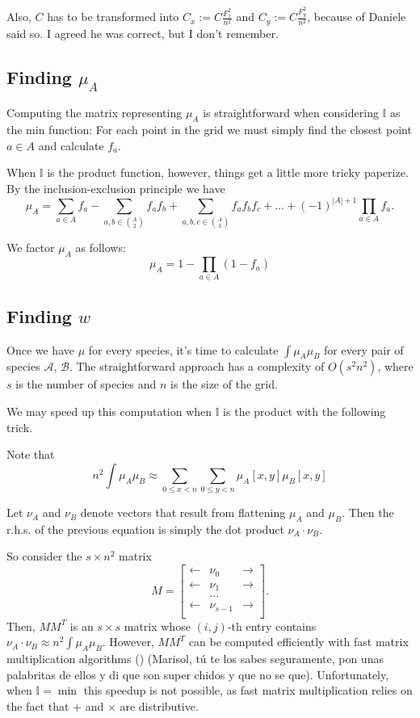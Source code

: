 \documentclass[12pt]{article}
\numberwithin{equation}{section} %
\numberwithin{figure}{section} %
\def\cA{{\mathcal{A}}}
\def\cB{{\mathcal{B}}}
\def\II{{\mathbb{I}}}
\theoremstyle{definition}
\def\tcr#1{\textcolor{MyRed}{#1}}
\begin{document}
	Also, $C$ has to be transformed into $C_x := C\frac{F_x^2}{n^2}$ and $C_y :=  C\frac{F_y^2}{n^2}$, because of \tcr{Daniele said so. I agreed he was correct, but I don't remember.}

\subsection{Finding \texorpdfstring{$\mu_A$}{mu\_A}}
Computing the matrix representing $\mu_A$ is straightforward when considering $\II$ as the min function: For each point in the grid we must simply find the closest point $a\in A$ and calculate $f_a$.

When $\II$ is the product function, however, things get a little more tricky \tcr{paperize}. By the inclusion-exclusion principle we have
	$$\mu_A = \sum_{a\in A} f_{a} - \sum_{a,b \in \binom{A}{2}} f_a f_b + \sum_{a,b,c \in \binom{A}{3} } f_a f_{b} f_{c} + \dots + (-1)^{|A|+1} \prod_{a\in A} f_a.$$

	We factor $\mu_A$ as follows:
$$\mu_A = 1-\prod_{a\in A} (1-f_a)$$

	

	\subsection{Finding \texorpdfstring{$w$}{w}}
	
	Once we have $\mu$ for every species, it's time to calculate $\int \mu_A\mu_B$ for every pair of species $\cA$, $\cB$. The straightforward approach has a complexity of $O(s^2n^2)$, where $s$ is the number of species and $n$ is the size of the grid.
	
	We may speed up this computation when $\II$ is the product with the following trick. 
	
	Note that 
		$$n^2\int \mu_A \mu_B \approx \sum_{0\leq x < n} \sum_{0\leq y < n} \mu_A[x,y]\mu_B[x,y]$$
	
	Let $\nu_A$ and $\nu_B$ denote vectors that result from flattening $\mu_A$ and $\mu_B$. Then the r.h.s. of the previous equation is simply the dot product $\nu_A\cdot \nu_B$.
	
	So consider the $s\times n^2$ matrix 
	$$M = \begin{bmatrix}
	        \longleftarrow & \nu_0 & \longrightarrow \\
	        \longleftarrow & \nu_1 & \longrightarrow \\
	          & \dots &   \\
					\longleftarrow & \nu_{s-1} & \longrightarrow \\
	      \end{bmatrix}.
	$$
Then, $MM^T$ is an $s\times s$ matrix whose $(i,j)$-th entry contains $\nu_A\cdot \nu_B \approx n^2\int \mu_A \mu_B$. However, $MM^T$ can be computed efficiently with fast matrix multiplication algorithms (\cite{strassen}) \tcr{(Marisol, tú te los sabes seguramente, pon unas palabritas de ellos y di que son super chidos y que no se que)}. Unfortunately, when $\II = \min$ this speedup is not possible, as fast matrix multiplication relies on the fact that $+$ and $\times$ are distributive.
\end{document}
